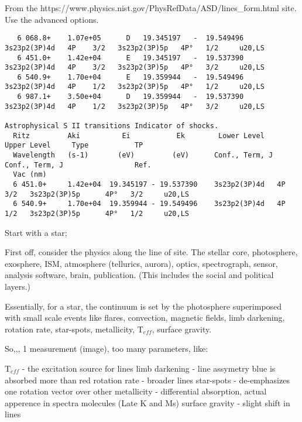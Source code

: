 From the https://www.physics.nist.gov/PhysRefData/ASD/lines_form.html
site. Use the advanced options.

\begingroup \fontsize{10pt}{10pt}
\selectfont
\begin{verbatim} 
   6 068.8+    1.07e+05      D   19.345197   -  19.549496    3s23p2(3P)4d   4P    3/2   3s23p2(3P)5p   4P°   1/2     u20,LS    
   6 451.0+    1.42e+04      E   19.345197   -  19.537390    3s23p2(3P)4d   4P    3/2   3s23p2(3P)5p   4P°   3/2     u20,LS    
   6 540.9+    1.70e+04      E   19.359944   -  19.549496    3s23p2(3P)4d   4P    1/2   3s23p2(3P)5p   4P°   1/2     u20,LS    
   6 987.1+    3.50e+04      D   19.359944   -  19.537390    3s23p2(3P)4d   4P    1/2   3s23p2(3P)5p   4P°   3/2     u20,LS    

Astrophysical S II transitions Indicator of shocks.
  Ritz         Aki          Ei           Ek        Lower Level                 Upper Level     Type           TP 
  Wavelength   (s-1)       (eV)         (eV)      Conf., Term, J              Conf., Term, J                 Ref.
  Vac (nm)    
  6 451.0+     1.42e+04  19.345197 - 19.537390    3s23p2(3P)4d   4P    3/2   3s23p2(3P)5p      4P°   3/2     u20,LS    
  6 540.9+     1.70e+04  19.359944 - 19.549496    3s23p2(3P)4d   4P    1/2   3s23p2(3P)5p      4P°   1/2     u20,LS    
\end{verbatim}
\endgroup

Start with a star;

First off, consider the physics along the line of site. The stellar
core, photosphere, exosphere, ISM, atmosphere (tellurics, aurora),
optics, spectrograph, sensor, analysis software, brain,
publication. (This includes the social and political layers.)

Essentially, for a star, the continuum is set by the photosphere
superimposed with small scale events like flares, convection, magnetic
fields, limb darkening, rotation rate, star-spots, metallicity,
T$_{eff}$, surface gravity.

So,,, 1 measurement (image), too many parameters, like:

T$_{eff}$        - the excitation source for lines
limb darkening  - line assymetry blue is absorbed more than red
rotation rate   - broader lines
star-spots      - de-emphasizes one rotation vector over other
metallicity     - differential absorption, actual apperence in spectra
   molecules (Late K and Ms)
surface gravity - slight shift in lines 

